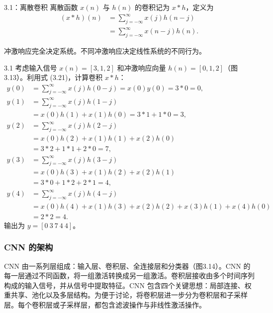 \begin{bookdefinition}{3.1：离散卷积}
离散函数 $x(n)$ 与 $h(n)$ 的卷积记为 $x*h$，定义为
\begin{equation}
\begin{aligned}
(x*h)(n)
&=\sum_{j=-\infty}^{\infty}x(j)h(n-j)\\
&=\sum_{j=-\infty}^{\infty}x(n-j)h(n).
\end{aligned}
\tag{3.21}
\end{equation}
\end{bookdefinition}



冲激响应完全决定系统。不同冲激响应决定线性系统的不同行为。

\begin{bookexample}{3.1}
考虑输入信号 $x(n)=[3,1,2]$ 和冲激响应向量 $h(n)=[0,1,2]$（图3.13）。利用式 (3.21)，计算卷积 $x*h$：
\[
\begin{aligned}
y(0)&=\sum_{j=-\infty}^{\infty}x(j)h(0-j)
=x(0)y(0)=3*0=0,\\
y(1)&=\sum_{j=-\infty}^{\infty}x(j)h(1-j)\\
&=x(0)h(1)+x(1)h(0)=3*1+1*0=3,\\
y(2)&=\sum_{j=-\infty}^{\infty}x(j)h(2-j)\\
&=x(0)h(2)+x(1)h(1)+x(2)h(0)\\
&=3*2+1*1+2*0=7,\\
y(3)&=\sum_{j=-\infty}^{\infty}x(j)h(3-j)\\
&=x(0)h(3)+x(1)h(2)+x(2)h(1)\\
&=3*0+1*2+2*1=4,\\
y(4)&=\sum_{j=-\infty}^{\infty}x(j)h(4-j)\\
&=x(0)h(4)+x(1)h(3)+x(2)h(2)+x(3)h(1)+x(4)h(0)\\
&=2*2=4.
\end{aligned}
\]
输出为 $y=[0\ 3\ 7\ 4\ 4]$。
\end{bookexample}


\FloatBarrier

\subsubsection{CNN 的架构}

CNN 由一系列层组成：输入层、卷积层、全连接层和分类器（图3.14）。CNN 的每一层通过不同函数，将一组激活转换成另一组激活。卷积层接收由多个时间序列构成的输入信号，并从信号中提取特征。CNN 包含四个关键思想：局部连接、权重共享、池化以及多层结构。为便于讨论，将卷积层进一步分为卷积层和子采样层。每个卷积层或子采样层，都包含滤波操作与非线性激活操作。

